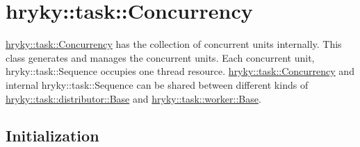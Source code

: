 \hypertarget{hryky_1_1task_Concurrency}{}\section{hryky\-::task\-::\-Concurrency}\label{hryky_1_1task_Concurrency}
\hyperlink{classhryky_1_1task_1_1_concurrency}{hryky\-::task\-::\-Concurrency} has the collection of concurrent units internally. This class generates and manages the concurrent units. Each concurrent unit, hryky\-::task\-::\-Sequence occupies one thread resource. \hyperlink{classhryky_1_1task_1_1_concurrency}{hryky\-::task\-::\-Concurrency} and internal hryky\-::task\-::\-Sequence can be shared between different kinds of \hyperlink{classhryky_1_1task_1_1distributor_1_1_base}{hryky\-::task\-::distributor\-::\-Base} and \hyperlink{classhryky_1_1task_1_1worker_1_1_base}{hryky\-::task\-::worker\-::\-Base}.

\hypertarget{hryky_1_1task_Initialization}{}\subsection{Initialization}\label{hryky_1_1task_Initialization}

